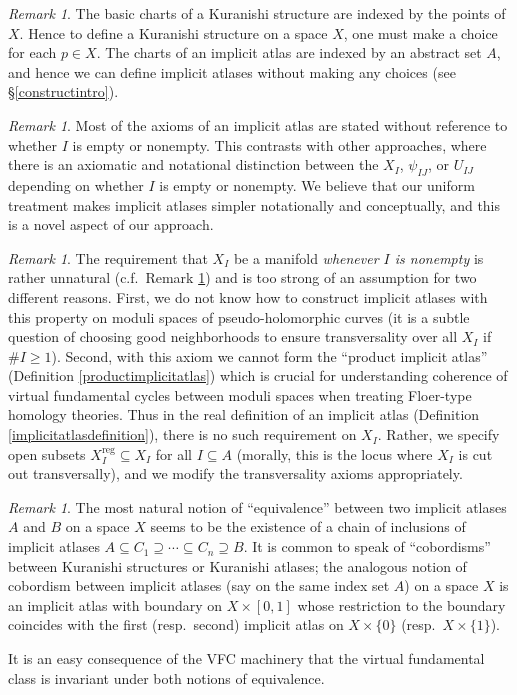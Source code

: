 \documentclass[12pt]{article}
\theoremstyle{definition}
\theoremstyle{remark}
\newtheorem{remark}[theorem]{Remark}
\numberwithin{equation}{subsection}
\newcommand{\reg}{\mathrm{reg}}
\begin{document}
\begin{remark}
The basic charts of a Kuranishi structure are indexed by the points of $X$.  Hence to define a Kuranishi structure on a space $X$, one must make a choice for each $p\in X$.  The charts of an implicit atlas are indexed by an abstract set $A$, and hence we can define implicit atlases without making any choices (see \S\ref{constructintro}).
\end{remark}

\begin{remark}\label{Iemptynotspecial}
Most of the axioms of an implicit atlas are stated without reference to whether $I$ is empty or nonempty.  This contrasts with other approaches, where there is an axiomatic and notational distinction between the $X_I$, $\psi_{IJ}$, or $U_{IJ}$ depending on whether $I$ is empty or nonempty.  We believe that our uniform treatment makes implicit atlases simpler notationally and conceptually, and this is a novel aspect of our approach.
\end{remark}

\begin{remark}\label{bettertouseXSreg}
The requirement that $X_I$ be a manifold \emph{whenever $I$ is nonempty} is rather unnatural (c.f.\ Remark \ref{Iemptynotspecial}) and is too strong of an assumption for two different reasons.  First, we do not know how to construct implicit atlases with this property on moduli spaces of pseudo-holomorphic curves (it is a subtle question of choosing good neighborhoods to ensure transversality over all $X_I$ if $\#I\geq 1$).  Second, with this axiom we cannot form the ``product implicit atlas'' (Definition \ref{productimplicitatlas}) which is crucial for understanding coherence of virtual fundamental cycles between moduli spaces when treating Floer-type homology theories.  Thus in the real definition of an implicit atlas (Definition \ref{implicitatlasdefinition}), there is no such requirement on $X_I$.  Rather, we specify open subsets $X_I^\reg\subseteq X_I$ for all $I\subseteq A$ (morally, this is the locus where $X_I$ is cut out transversally), and we modify the transversality axioms appropriately.
\end{remark}

\begin{remark}\label{equivalenceofIA}
The most natural notion of ``equivalence'' between two implicit atlases $A$ and $B$ on a space $X$ seems to be the existence of a chain of inclusions of implicit atlases $A\subseteq C_1\supseteq\cdots\subseteq C_n\supseteq B$.  It is common to speak of ``cobordisms'' between Kuranishi structures or Kuranishi atlases; the analogous notion of cobordism between implicit atlases (say on the same index set $A$) on a space $X$ is an implicit atlas with boundary on $X\times[0,1]$ whose restriction to the boundary coincides with the first (resp.\ second) implicit atlas on $X\times\{0\}$ (resp.\ $X\times\{1\}$).

It is an easy consequence of the VFC machinery that the virtual fundamental class is invariant under both notions of equivalence.
\end{remark}
\end{document}
